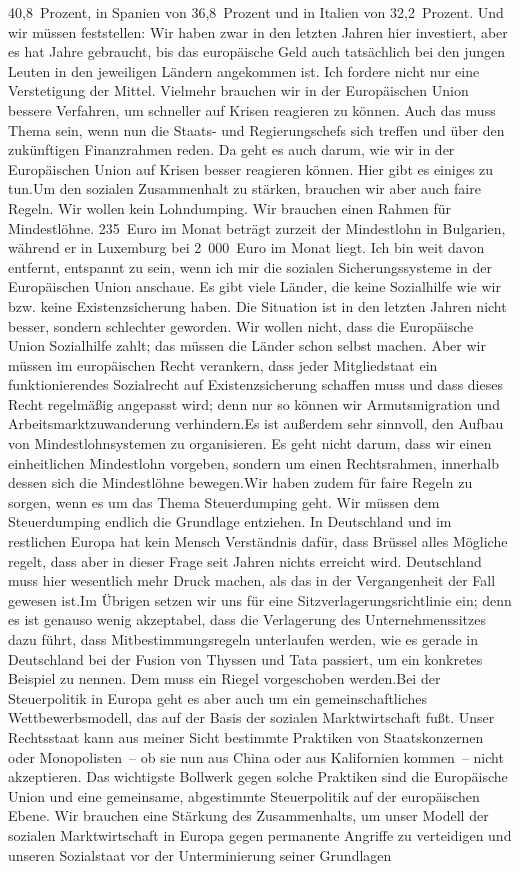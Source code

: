 \documentclass{article}
\begin{document}
40,8 Prozent, in Spanien von 36,8 Prozent und in Italien von 32,2 Prozent. Und wir müssen feststellen: Wir haben zwar in den letzten Jahren hier investiert, aber es hat Jahre gebraucht, bis das europäische Geld auch tatsächlich bei den jungen Leuten in den jeweiligen Ländern angekommen ist. Ich fordere nicht nur eine Verstetigung der Mittel. Vielmehr brauchen wir in der Europäischen Union bessere Verfahren, um schneller auf Krisen reagieren zu können. Auch das muss Thema sein, wenn nun die Staats- und Regierungschefs sich treffen und über den zukünftigen Finanzrahmen reden. Da geht es auch darum, wie wir in der Europäischen Union auf Krisen besser reagieren können. Hier gibt es einiges zu tun.Um den sozialen Zusammenhalt zu stärken, brauchen wir aber auch faire Regeln. Wir wollen kein Lohndumping. Wir brauchen einen Rahmen für Mindestlöhne. 235 Euro im Monat beträgt zurzeit der Mindestlohn in Bulgarien, während er in Luxemburg bei 2 000 Euro im Monat liegt. Ich bin weit davon entfernt, entspannt zu sein, wenn ich mir die sozialen Sicherungssysteme in der Europäischen Union anschaue. Es gibt viele Länder, die keine Sozialhilfe wie wir bzw. keine Existenzsicherung haben. Die Situation ist in den letzten Jahren nicht besser, sondern schlechter geworden. Wir wollen nicht, dass die Europäische Union Sozialhilfe zahlt; das müssen die Länder schon selbst machen. Aber wir müssen im europäischen Recht verankern, dass jeder Mitgliedstaat ein funktionierendes Sozialrecht auf Existenzsicherung schaffen muss und dass dieses Recht regelmäßig angepasst wird; denn nur so können wir Armutsmigration und Arbeitsmarktzuwanderung verhindern.Es ist außerdem sehr sinnvoll, den Aufbau von Mindestlohnsystemen zu organisieren. Es geht nicht darum, dass wir einen einheitlichen Mindestlohn vorgeben, sondern um einen Rechtsrahmen, innerhalb dessen sich die Mindestlöhne bewegen.Wir haben zudem für faire Regeln zu sorgen, wenn es um das Thema Steuerdumping geht. Wir müssen dem Steuerdumping endlich die Grundlage entziehen. In Deutschland und im restlichen Europa hat kein Mensch Verständnis dafür, dass Brüssel alles Mögliche regelt, dass aber in dieser Frage seit Jahren nichts erreicht wird. Deutschland muss hier wesentlich mehr Druck machen, als das in der Vergangenheit der Fall gewesen ist.Im Übrigen setzen wir uns für eine Sitzverlagerungsrichtlinie ein; denn es ist genauso wenig akzeptabel, dass die Verlagerung des Unternehmenssitzes dazu führt, dass Mitbestimmungsregeln unterlaufen werden, wie es gerade in Deutschland bei der Fusion von Thyssen und Tata passiert, um ein konkretes Beispiel zu nennen. Dem muss ein Riegel vorgeschoben werden.Bei der Steuerpolitik in Europa geht es aber auch um ein gemeinschaftliches Wettbewerbsmodell, das auf der Basis der sozialen Marktwirtschaft fußt. Unser Rechtsstaat kann aus meiner Sicht bestimmte Praktiken von Staatskonzernen oder Monopolisten – ob sie nun aus China oder aus Kalifornien kommen – nicht akzeptieren. Das wichtigste Bollwerk gegen solche Praktiken sind die Europäische Union und eine gemeinsame, abgestimmte Steuerpolitik auf der europäischen Ebene. Wir brauchen eine Stärkung des Zusammenhalts, um unser Modell der sozialen Marktwirtschaft in Europa gegen permanente Angriffe zu verteidigen und unseren Sozialstaat vor der Unterminierung seiner Grundlagen 
\end{document}
